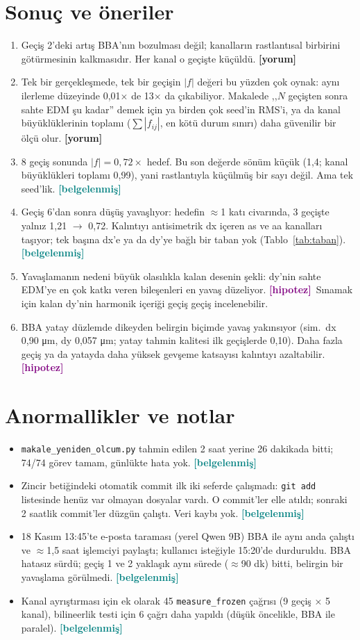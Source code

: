 \documentclass[11pt,a4paper]{article}
\newcommand{\bel}{\textcolor{teal}{\textbf{\footnotesize [belgelenmiş]}}}
\newcommand{\yor}{\textcolor{orange!80!black}{\textbf{\footnotesize [yorum]}}}
\newcommand{\hip}{\textcolor{purple}{\textbf{\footnotesize [hipotez]}}}
\newcommand{\kod}[1]{{\XeTeXinterchartokenstate=0 \texttt{#1}}}
\begin{document}
\section{Sonuç ve öneriler}
\begin{enumerate}
\item Geçiş 2'deki artış BBA'nın bozulması değil; kanalların rastlantısal birbirini götürmesinin
  kalkmasıdır. Her kanal o geçişte küçüldü. \yor
\item Tek bir gerçekleşmede, tek bir geçişin $|f|$ değeri bu yüzden çok oynak: aynı ilerleme
  düzeyinde 0{,}01$\times$ de 13$\times$ da çıkabiliyor. Makalede ,,$N$ geçişten sonra
  sahte EDM şu kadar'' demek için ya birden çok seed'in RMS'i, ya da kanal büyüklüklerinin
  toplamı ($\sum|f_{ij}|$, en kötü durum sınırı) daha güvenilir bir ölçü olur. \yor
\item 8 geçiş sonunda $|f| = 0{,}72\times$ hedef. Bu son değerde sönüm küçük (1{,}4; kanal
  büyüklükleri toplamı 0{,}99), yani rastlantıyla küçülmüş bir sayı değil. Ama tek seed'lik. \bel
\item Geçiş 6'dan sonra düşüş yavaşlıyor: hedefin $\approx$1 katı civarında, 3 geçişte yalnız 1{,}21
  $\to$ 0{,}72. Kalıntıyı antisimetrik dx içeren as ve aa kanalları taşıyor; tek başına dx'e ya
  da dy'ye bağlı bir taban yok (Tablo~\ref{tab:taban}). \bel
\item Yavaşlamanın nedeni büyük olasılıkla kalan desenin şekli: dy'nin sahte EDM'ye en çok katkı
  veren bileşenleri en yavaş düzeliyor. \hip\ Sınamak için kalan dy'nin harmonik içeriği
  geçiş geçiş incelenebilir.
\item BBA yatay düzlemde dikeyden belirgin biçimde yavaş yakınsıyor (sim.~dx 0{,}90 μm, dy
  0{,}057 μm; yatay tahmin kalitesi ilk geçişlerde 0{,}10). Daha fazla geçiş ya da yatayda daha
  yüksek gevşeme katsayısı kalıntıyı azaltabilir. \hip
\end{enumerate}

\section{Anormallikler ve notlar}
\begin{itemize}
\item \kod{makale\_yeniden\_olcum.py} tahmin edilen 2 saat yerine 26 dakikada bitti; 74/74 görev
  tamam, günlükte hata yok. \bel
\item Zincir betiğindeki otomatik commit ilk iki seferde çalışmadı: \kod{git add} listesinde henüz
  var olmayan dosyalar vardı. O commit'ler elle atıldı; sonraki 2 saatlik commit'ler düzgün
  çalıştı. Veri kaybı yok. \bel
\item 18 Kasım 13:45'te e-posta taraması (yerel Qwen 9B) BBA ile aynı anda çalıştı ve $\approx$1{,}5 saat
  işlemciyi paylaştı; kullanıcı isteğiyle 15:20'de durduruldu. BBA hatasız sürdü; geçiş 1 ve 2 yaklaşık aynı sürede ($\approx$90 dk) bitti, belirgin bir yavaşlama görülmedi. \bel
\item Kanal ayrıştırması için ek olarak 45 \kod{measure\_frozen} çağrısı (9 geçiş × 5 kanal), bilineerlik testi için 6 çağrı daha yapıldı (düşük
  öncelikle, BBA ile paralel). \bel
\end{itemize}
\end{document}
